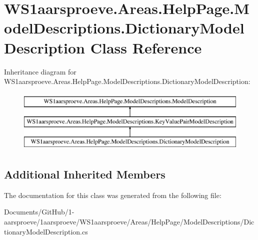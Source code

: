 \hypertarget{class_w_s1aarsproeve_1_1_areas_1_1_help_page_1_1_model_descriptions_1_1_dictionary_model_description}{}\section{W\+S1aarsproeve.\+Areas.\+Help\+Page.\+Model\+Descriptions.\+Dictionary\+Model\+Description Class Reference}
\label{class_w_s1aarsproeve_1_1_areas_1_1_help_page_1_1_model_descriptions_1_1_dictionary_model_description}
Inheritance diagram for W\+S1aarsproeve.\+Areas.\+Help\+Page.\+Model\+Descriptions.\+Dictionary\+Model\+Description\+:\begin{figure}[H]
\begin{center}
\leavevmode
\includegraphics[height=3.000000cm]{class_w_s1aarsproeve_1_1_areas_1_1_help_page_1_1_model_descriptions_1_1_dictionary_model_description}
\end{center}
\end{figure}
\subsection*{Additional Inherited Members}


The documentation for this class was generated from the following file\+:\begin{DoxyCompactItemize}
\item 
Documents/\+Git\+Hub/1-\/aarsproeve/1aarsproeve/\+W\+S1aarsproeve/\+Areas/\+Help\+Page/\+Model\+Descriptions/Dictionary\+Model\+Description.\+cs\end{DoxyCompactItemize}
